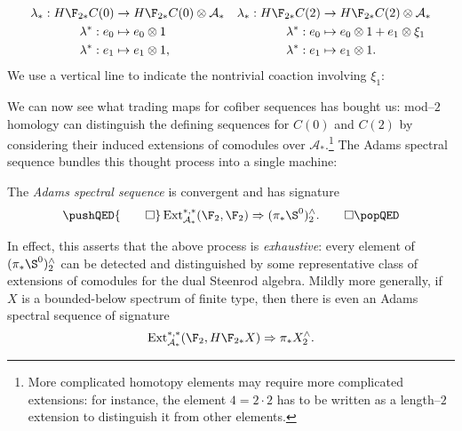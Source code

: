 \begin{align*}
\lambda_*: H\F_{2*} C(0) & \to H\F_{2*} C(0) \otimes \mathcal A_* & \lambda_*: H\F_{2*} C(2) & \to H\F_{2*} C(2) \otimes \mathcal A_* \\
\lambda^*: e_0 & \mapsto e_0 \otimes 1 & \lambda^*: e_0 & \mapsto e_0 \otimes 1 + e_1 \otimes \xi_1 \\
\lambda^*: e_1 & \mapsto e_1 \otimes 1, & \lambda^*: e_1 & \mapsto e_1 \otimes 1.
\end{align*}
We use a vertical line to indicate the nontrivial coaction involving \(\xi_1\):
\begin{center}
\end{center}
We can now see what trading maps for cofiber sequences has bought us: mod--\(2\) homology can distinguish the defining sequences for \(C(0)\) and \(C(2)\) by considering their induced extensions of comodules over \(\mathcal A_*\).\footnote{More complicated homotopy elements may require more complicated extensions: for instance, the element \(4 = 2 \cdot 2\) has to be written as a length--\(2\) extension to distinguish it from other elements.}  The Adams spectral sequence bundles this thought process into a single machine:
\begin{theorem}
The \textit{Adams spectral sequence} is convergent and has signature
\[
\pushQED{\qed}
\Ext_{\mathcal A_*}^{*, *}(\F_2, \F_2) \Rightarrow (\pi_* \S^0)^\wedge_2.\qedhere
\popQED
\]
\end{theorem}
In effect, this asserts that the above process is \emph{exhaustive}: every element of \((\pi_* \S^0)^\wedge_2\) can be detected and distinguished by some representative class of extensions of comodules for the dual Steenrod algebra.  Mildly more generally, if \(X\) is a bounded-below spectrum of finite type, then there is even an Adams spectral sequence of signature \[\Ext_{\mathcal A_*}^{*, *}(\F_2, H\F_{2*} X) \Rightarrow \pi_* X^\wedge_2.\]

